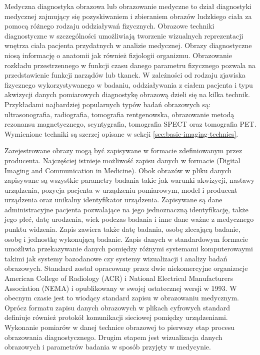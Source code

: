 Medyczna diagnostyka obrazowa lub obrazowanie medyczne to dział diagnostyki medycznej zajmujący się pozyskiwaniem i zbieraniem obrazów ludzkiego ciała za pomocą różnego rodzaju oddziaływań fizycznych.
Obrazowe techniki diagnostyczne w szczególności umożliwiają tworzenie wizualnych reprezentacji wnętrza ciała pacjenta przydatnych w analizie medycznej. Obrazy diagnostyczne niosą informację o anatomii jak również fizjologii organizmu.
Obrazowanie rozkładu przestrzennego w funkcji czasu danego parametru fizycznego pozwala na przedstawienie funkcji narządów lub tkanek.
W zależności od rodzaju zjawiska fizycznego wykorzystywanego w badaniu, oddziaływania z ciałem pacjenta i typu akwizycji danych pomiarowych diagnostykę obrazową dzieli się na kilka technik.
Przykładami najbardziej popularnych typów badań obrazowych są: ultrasonografia, radiografia, tomografia rentgenowska, obrazowanie metodą rezonansu magnetycznego, scyntygrafia, tomografia SPECT oraz tomografia PET.
Wymienione techniki są szerzej opisane w sekcji \ref{sec:basic-imaging-technics}.
\par
Zarejestrowane obrazy mogą być zapisywane w formacie zdefiniowanym przez producenta.
Najczęściej istnieje możliwość zapisu danych w formacie \DICOM (Digital Imaging and Communication in Medicine). 
Obok obrazów w pliku danych zapisywane są wszystkie parametry badania takie jak warunki akwizycji, nastawy urządzenia, pozycja pacjenta w urządzeniu pomiarowym, model i producent urządzenia oraz unikalny identyfikator urządzenia.
Zapisywane są dane administracyjne pacjenta pozwalające na jego jednoznaczną identyfikację, także jego płeć, datę urodzenia, wiek podczas badania i inne dane ważne z medycznego punktu widzenia.
Zapis zawiera także datę badania, osobę zlecającą badanie, osobę i jednostkę wykonującą badanie.
Zapis danych w standardowym formacie \DICOM umożliwia przekazywanie danych pomiędzy różnymi systemami komputerowaymi takimi jak systemy bazodanowe czy systemy wizualizacji i analizy badań obrazowych.
Standard \DICOM został opracowany przez dwie niekomercyjne organizacje American College of Radiology (ACR) i National Electrical Manufacturers Association (NEMA) i opublikowany w swojej ostatecznej wersji w 1993.
W obecnym czasie jest to wiodący standard zapisu w obrazowaniu medycznym.
Oprócz formatu zapisu danych obrazowych w plikach cyfrowych standard \DICOM definiuje również protokół komunikacji sieciowej pomiędzy urządzeniami.
Wykonanie pomiarów w danej technice obrazowej to pierwszy etap procesu obrazowania diagnostycznego. Drugim etapem jest wizualizacja danych obrazowych i parametrów badania w sposób przyjęty w medycynie.
